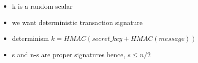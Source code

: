 \begin{itemize}
    \item k is a random scalar
    \item we want deterministic transaction signature
    \item determinism $k = HMAC(secret\_key + HMAC(message))$
    \item s and n-s are proper signatures hence, $s \leq n/2$
\end{itemize}

